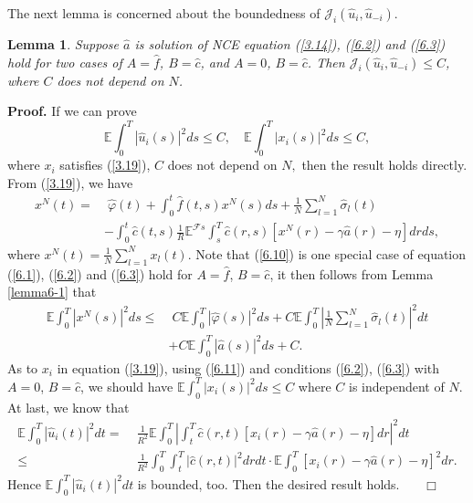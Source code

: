 \documentclass[11pt]{article}
\newenvironment{proof}[1][Proof]{\noindent \textbf{#1.} }{\ \ \  $\Box$}
\newtheorem{lemma}{Lemma}[section]
\def\dbE{\mathbb{E}}
\begin{document}
The next lemma is concerned about the boundedness of
$\mathcal{J}_{i}(\widehat{u}_i,\widehat{u}_{-i})$.
\begin{lemma}\label{lemma6.3}
Suppose $\widehat{a}$ is solution of NCE equation (\ref{3.14}),
(\ref{6.2}) and (\ref{6.3}) hold for two cases of $A=\widehat{f}$,
$B=\widehat{c}$, and $A=0$, $B=\widehat{c}$. Then
$\mathcal{J}_{i}(\widehat{u}_i,\widehat{u}_{-i})\leq C$, where $C$
does not depend on $N$.
\end{lemma}
\begin{proof}
If we can prove
%
\[
\dbE\int_{0}^{T}|\widehat{u}_{i}(s)|^{2}ds\leq C,\quad
\dbE\int_{0}^{T}|x_{i}(s)|^{2}ds\leq C,
\]
%
where $x_i$ satisfies (\ref{3.19}), $C$ does not depend on $N,$ then
the result holds directly. From (\ref{3.19}), we have
%
\begin{align}
x^{N}(t) = & \; \widehat{\varphi }(t)+\int_{0}^{t}\widehat{f}(t,s)x^{N}(s)ds+\frac{1}{N}\sum_{l=1}^{N}\widehat{\sigma }_{l}(t) \nonumber \\
&-\int_{0}^{t}\widehat{c}(t,s)\frac{1}{R}\dbE^{\mathcal{F}s}\int_{s}^{T}\widehat{c}(r,s)[x^{N}(r)-\gamma \widehat{a}(r)-\eta ]drds, \label{6.10}
\end{align}
%
where $x^{N}(t)=\frac{1}{N}\sum\limits_{l=1}^{N}x_{l}(t).$ Note that
(\ref{6.10}) is one special case of equation (\ref{6.1}),
(\ref{6.2}) and (\ref{6.3}) hold for $A=\widehat{f}$,
$B=\widehat{c}$, it then follows from Lemma \ref{lemma6-1} that
%
\begin{align}
\dbE\int_{0}^{T}|x^{N}(s)|^{2}ds \leq & \; C\dbE\int_{0}^{T}|\widehat{\varphi}(s)|^{2}ds+C\dbE\int_{0}^{T}\left\vert \frac{1}{N}\sum_{l=1}^{N}\widehat{\sigma}_{l}(t)\right\vert ^{2}dt \nonumber \\
& +C\dbE\int_{0}^{T}|\widehat{a}(s)|^{2}ds+C. \label{6.11}
\end{align}
%
As to $x_i$ in equation (\ref{3.19}), using (\ref{6.11}) and
conditions (\ref{6.2}), (\ref{6.3}) with $A=0$, $B=\widehat{c}$, we
should have $\dbE\int_{0}^{T}|x_{i}(s)|^{2}ds\leq C$ where $C$ is
independent of $N$. At last, we know that
%
\begin{align*}
\dbE\int_{0}^{T}|\widehat{u}_{i}(t)|^{2}dt
= & \; \frac{1}{R^{2}}\dbE\int_{0}^{T}\left\vert\int_{t}^{T}\widehat{c}(r,t)[x_{i}(r)-\gamma\widehat{a}(r)-\eta ]dr\right\vert ^{2}dt \\
\leq & \; \frac{1}{R^{2}}\int_{0}^{T}\int_{t}^{T}|\widehat{c}(r,t)|^{2}drdt\cdot \dbE\int_{0}^{T}[x_{i}(r)-\gamma\widehat{a}(r)-\eta ]^{2}dr.
\end{align*}
%
Hence $\dbE\int_{0}^{T}|\widehat{u}_{i}(t)|^{2}dt$ is bounded, too.
Then the desired result holds.
\hfill
\end{proof}
\end{document}
